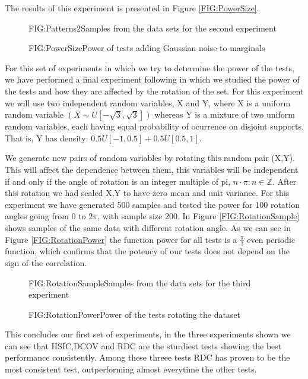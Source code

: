 The results of this experiment is presented in Figure \ref{FIG:PowerSize}. 
\FloatBarrier
\begin{figure}[Non linear dependance patterns example 2]{FIG:Patterns2}{Samples from the data sets for the second experiment}
\end{figure}

\begin{figure}[Power of tests increasing sample size]{FIG:PowerSize}{Power of tests adding Gaussian noise to marginals}
\end{figure}
\FloatBarrier
For this set of experiments in which we try to determine the power of the tests, we have performed a final experiment following \cite{Size} in which we studied the power of the tests and how they are affected by the rotation of the set.
For this experiment we will use two independent random variables, X and Y, where X is a uniform random variable $(X\sim U[-\sqrt{3},\sqrt{3}])$ whereas Y is a mixture of two uniform random variables, each having equal probability of ocurrence on disjoint supports. That is, Y has density: $0.5U[-1,0.5] + 0.5U[0.5,1]$.

We generate new pairs of random variables by rotating this random pair (X,Y). This will affect the dependence between them, this variables will be independent if and only if the angle of rotation is an integer multiple of pi, $n\cdot\pi : n\in\mathbb{Z}$. After this rotation we had scaled X,Y to have zero mean and unit variance.
For this experiment we have generated 500 samples and tested the power for 100 rotation angles going from 0 to $2\pi$, with sample size 200. In Figure \ref{FIG:RotationSample} shows samples of the same data with different rotation angle.
As we can see in Figure \ref{FIG:RotationPower} the function power for all tests is a $\frac{\pi}{2}$ even periodic function, which confirms that the potency of our tests does not depend on the sign of the correlation.
\FloatBarrier
\begin{figure}[Experiment 3 rotation pattern sample]{FIG:RotationSample}{Samples from the data sets for the third experiment}
\end{figure}
\begin{figure}[Experiment 3 results]{FIG:RotationPower}{Power of the tests rotating the dataset}
\end{figure}
\FloatBarrier
This concludes our first set of experiments, in the three experiments shown we can see that HSIC,DCOV and RDC are the sturdiest tests showing the best performance consistently. Among these threee tests RDC has proven to be the most consistent test, outperforming almost everytime the other tests. 


